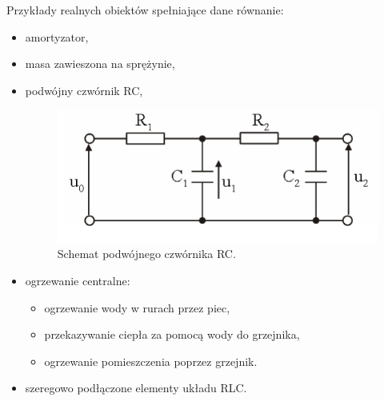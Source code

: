\documentclass[a4paper]{article}
\begin{document}
    Przykłady realnych obiektów spełniające dane równanie:
    \begin{itemize}
        \item amortyzator,
        \item masa zawieszona na sprężynie,
        \item podwójny czwórnik RC,
            \begin{figure}[H]
                \centering
                \includegraphics[scale=0.6]{czwornik.png}
                \caption{Schemat podwójnego czwórnika RC.}
            \end{figure}
        \item ogrzewanie centralne:
            \begin{itemize}
                \item ogrzewanie wody w rurach przez piec,
                \item przekazywanie ciepła za pomocą wody do grzejnika,
                \item ogrzewanie pomieszczenia poprzez grzejnik.
            \end{itemize}
        \item szeregowo podłączone elementy układu RLC.
    \end{itemize}
\end{document}
